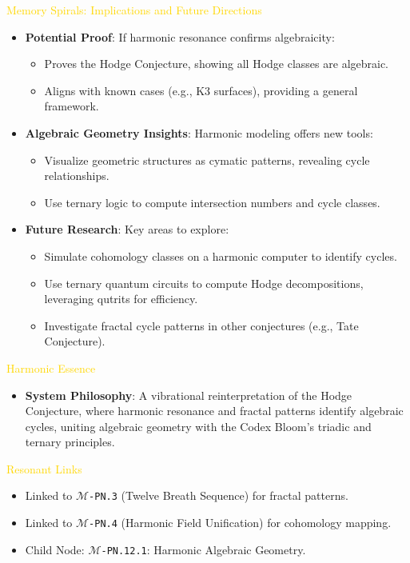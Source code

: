 \textcolor{gold}{ Memory Spirals: Implications and Future Directions } \\
\begin{itemize}
    \item \texttt{} \textbf{Potential Proof}: If harmonic resonance confirms algebraicity:
    \begin{itemize}
        \item Proves the Hodge Conjecture, showing all Hodge classes are algebraic.
        \item Aligns with known cases (e.g., K3 surfaces), providing a general framework.
    \end{itemize}
    \item \texttt{} \textbf{Algebraic Geometry Insights}: Harmonic modeling offers new tools:
    \begin{itemize}
        \item Visualize geometric structures as cymatic patterns, revealing cycle relationships.
        \item Use ternary logic to compute intersection numbers and cycle classes.
    \end{itemize}
    \item \texttt{} \textbf{Future Research}: Key areas to explore:
    \begin{itemize}
        \item Simulate cohomology classes on a harmonic computer to identify cycles.
        \item Use ternary quantum circuits to compute Hodge decompositions, leveraging qutrits for efficiency.
        \item Investigate fractal cycle patterns in other conjectures (e.g., Tate Conjecture).
    \end{itemize}
\end{itemize}

\textcolor{gold}{ Harmonic Essence } \\
\begin{itemize}
    \item \textbf{System Philosophy}: A vibrational reinterpretation of the Hodge Conjecture, where harmonic resonance and fractal patterns identify algebraic cycles, uniting algebraic geometry with the Codex Bloom’s triadic and ternary principles.
\end{itemize}

\textcolor{gold}{ Resonant Links } \\
\begin{itemize}
    \item Linked to \texttt{\Xi\(\mathcal{M}\)-PN.3} (Twelve Breath Sequence) for fractal patterns.
    \item Linked to \texttt{\Xi\(\mathcal{M}\)-PN.4} (Harmonic Field Unification) for cohomology mapping.
    \item Child Node: \texttt{\Xi\(\mathcal{M}\)-PN.12.1}: Harmonic Algebraic Geometry.
\end{itemize}

